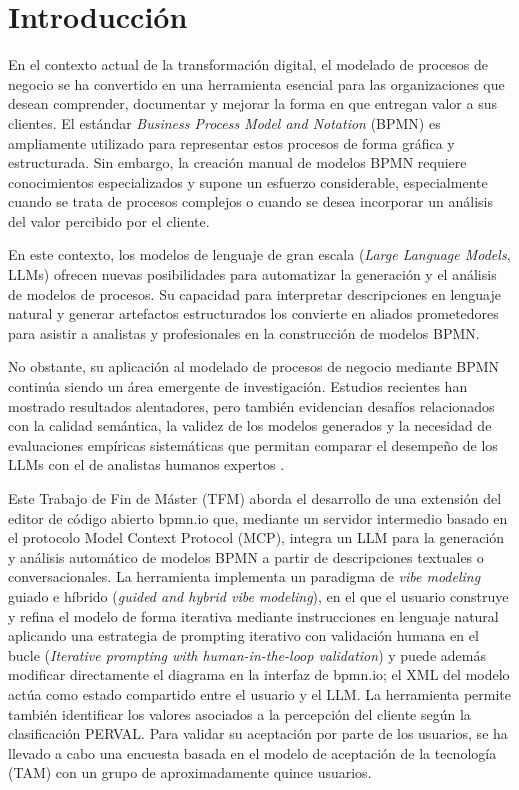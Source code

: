 

\chapter{Introducción}

En el contexto actual de la transformación digital, el modelado de procesos de negocio se ha convertido en una herramienta esencial para las organizaciones que desean comprender, documentar y mejorar la forma en que entregan valor a sus clientes. El estándar \textit{Business Process Model and Notation} (BPMN) es ampliamente utilizado para representar estos procesos de forma gráfica y estructurada. Sin embargo, la creación manual de modelos BPMN requiere conocimientos especializados y supone un esfuerzo considerable, especialmente cuando se trata de procesos complejos o cuando se desea incorporar un análisis del valor percibido por el cliente.

En este contexto, los modelos de lenguaje de gran escala (\textit{Large Language Models}, LLMs) ofrecen nuevas posibilidades para automatizar la generación y el análisis de modelos de procesos. Su capacidad para interpretar descripciones en lenguaje natural y generar artefactos estructurados los convierte en aliados prometedores para asistir a analistas y profesionales en la construcción de modelos BPMN.

No obstante, su aplicación al modelado de procesos de negocio mediante BPMN continúa siendo un área emergente de investigación. Estudios recientes han mostrado resultados alentadores, pero también evidencian desafíos relacionados con la calidad semántica, la validez de los modelos generados y la necesidad de evaluaciones empíricas sistemáticas que permitan comparar el desempeño de los LLMs con el de analistas humanos expertos \cite{kourani2025evaluating, kourani2024process}.

Este Trabajo de Fin de Máster (TFM) aborda el desarrollo de una extensión del editor de código abierto bpmn.io que, mediante un servidor intermedio basado en el protocolo Model Context Protocol (MCP), integra un LLM para la generación y análisis automático de modelos BPMN a partir de descripciones textuales o conversacionales. La herramienta implementa un paradigma de \textit{vibe modeling} guiado e híbrido (\textit{guided and hybrid vibe modeling}), en el que el usuario construye y refina el modelo de forma iterativa mediante instrucciones en lenguaje natural aplicando una estrategia de prompting iterativo con validación humana en el bucle  (\textit{Iterative prompting with human-in-the-loop validation}) y puede además modificar directamente el diagrama en la interfaz de bpmn.io; el XML del modelo actúa como estado compartido entre el usuario y el LLM. La herramienta permite también identificar los valores asociados a la percepción del cliente según la clasificación PERVAL. Para validar su aceptación por parte de los usuarios, se ha llevado a cabo una encuesta basada en el modelo de aceptación de la tecnología (TAM) con un grupo de aproximadamente quince usuarios.


